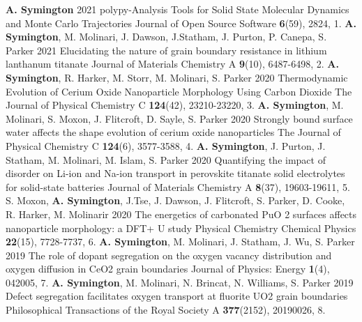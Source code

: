 \begin{cvpubys}
    \cvpuby
        {\textbf{A. Symington}}
        {2021}
        {polypy-Analysis Tools for Solid State Molecular Dynamics and Monte Carlo Trajectories}
        {Journal of Open Source Software}
        {\textbf{6}(59), 2824,}
        {}
        {1.}
    \cvpuby
        {\textbf{A. Symington}, M. Molinari, J. Dawson, J.Statham, J. Purton, P. Canepa, S. Parker}
        {2021}
        {Elucidating the nature of grain boundary resistance in lithium lanthanum titanate}
        {Journal of Materials Chemistry A}
        {\textbf{9}(10), 6487-6498,}
        {}
        {2.}
    \cvpuby
        {\textbf{A. Symington}, R. Harker, M. Storr, M. Molinari, S. Parker}
        {2020}
        {Thermodynamic Evolution of Cerium Oxide Nanoparticle Morphology Using Carbon Dioxide}
        {The Journal of Physical Chemistry C}
        {\textbf{124}(42), 23210-23220,}
        {}
        {3.}
    \cvpuby
        {\textbf{A. Symington}, M. Molinari, S. Moxon, J. Flitcroft, D. Sayle, S. Parker}
        {2020}
        {Strongly bound surface water affects the shape evolution of cerium oxide nanoparticles}
        {The Journal of Physical Chemistry C}
        {\textbf{124}(6), 3577-3588,}
        {}
        {4.}
    \cvpuby
        {\textbf{A. Symington}, J. Purton, J. Statham, M. Molinari, M. Islam, S. Parker}
        {2020}
        {Quantifying the impact of disorder on Li-ion and Na-ion transport in perovskite titanate solid electrolytes for solid-state batteries}
        {Journal of Materials Chemistry A}
        {\textbf{8}(37), 19603-19611,}
        {}
        {5.}
    \cvpuby
        {S. Moxon, \textbf{A. Symington}, J.Tse, J. Dawson, J. Flitcroft, S. Parker, D. Cooke, R. Harker, M. Molinarir}
        {2020}
        {The energetics of carbonated PuO 2 surfaces affects nanoparticle morphology: a DFT+ U study}
        {Physical Chemistry Chemical Physics}
        {\textbf{22}(15), 7728-7737,}
        {}
        {6.}
    \cvpuby
        {\textbf{A. Symington}, M. Molinari, J. Statham, J. Wu, S. Parker}
        {2019}
        {The role of dopant segregation on the oxygen vacancy distribution and oxygen diffusion in CeO2 grain boundaries}
        {Journal of Physics: Energy}
        {\textbf{1}(4), 042005,}
        {}
        {7.}
    \cvpuby
        {\textbf{A. Symington}, M. Molinari, N. Brincat, N. Williams, S. Parker}
        {2019}
        {Defect segregation facilitates oxygen transport at fluorite UO2 grain boundaries}
        {Philosophical Transactions of the Royal Society A}
        {\textbf{377}(2152), 20190026,}
        {}
        {8.}    
\end{cvpubys}
